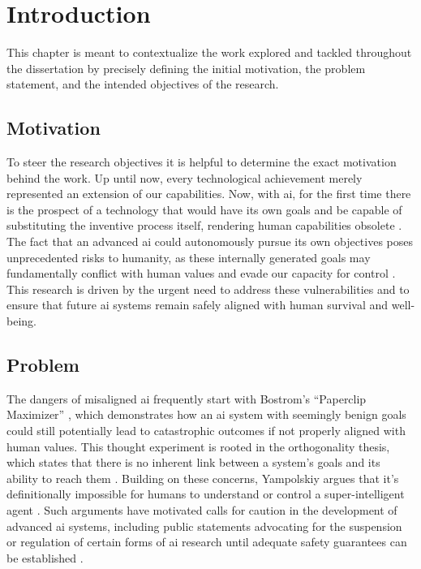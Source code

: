 \chapter{Introduction}\label{chap:introduction}

%



	This chapter is meant to contextualize the work explored and tackled throughout the dissertation by precisely defining the initial motivation, the problem statement, and the intended objectives of the research.

	\section{Motivation}

	To steer the research objectives it is helpful to determine the exact motivation behind the work. Up until now, every technological achievement merely represented an extension of our capabilities. Now, with \gls{ai}, for the first time there is the prospect of a technology that would have its own goals and be capable of substituting the inventive process itself, rendering human capabilities obsolete \cite{bostrom2014superintelligence, salmon_managing_2023}. The fact that an advanced \gls{ai} could autonomously pursue its own objectives poses unprecedented risks to humanity, as these internally generated goals may fundamentally conflict with human values and evade our capacity for control \cite{yampolskiy_controllability_2022, omohundro2008basic}. This research is driven by the urgent need to address these vulnerabilities and to ensure that future \gls{ai} systems remain safely aligned with human survival and well-being.

	\section{Problem}

	The dangers of misaligned \gls{ai} frequently start with Bostrom’s “Paperclip Maximizer” \cite{bostrom2014superintelligence}, which demonstrates how an \gls{ai} system with seemingly benign goals could still potentially lead to catastrophic outcomes if not properly aligned with human values. This thought experiment is rooted in the orthogonality thesis, which states that there is no inherent link between a system's goals and its ability to reach them \cite{bostrom2012superintelligent}.
	Building on these concerns, Yampolskiy argues that it's definitionally impossible for humans to understand or control a super-intelligent agent \cite{yampolskiy_controllability_2022}. Such arguments have motivated calls for caution in the development of advanced \gls{ai} systems, including public statements advocating for the suspension or regulation of certain forms of \gls{ai} research until adequate safety guarantees can be established \cite{FLI_SuperintelligenceStatement2025}.

